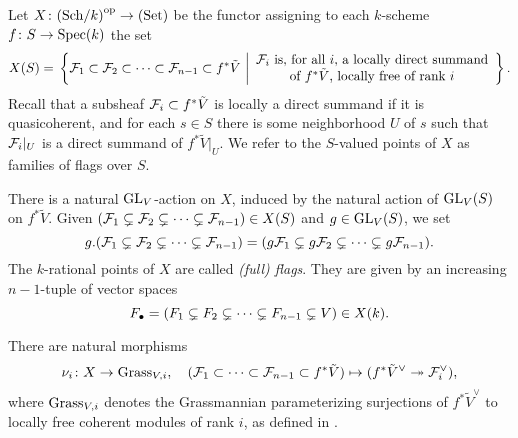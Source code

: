 \documentclass[../main.tex]{subfiles}
\begin{document}
\begin{defi}\label{def:FlagVariety}
  Let $X\colon  {(\mathrm{Sch}/{k})}^{\mathrm{op}} \to {(\mathrm{Set})}$ be the functor assigning to each $k$-scheme 
  $f\colon S \to \operatorname{Spec}(k)$
  the set 
  \begin{equation*}
    X(S) = \\ \left\{\cF_1 \subset \cF_2 \subset \dots \subset \cF_{n-1} \subset
      f^* \tilde V \ \bigg \vert  \begin{array}c
      \text{$\cF_i$ is, for all $i$, a locally direct summand} \\
      \text{of $f^*\tilde V$, locally free of rank $i$}
  \end{array} \right\}.
  \end{equation*}
  Recall that a subsheaf $\mathcal{F}_i \subset f^* \tilde V$ is
  locally a direct summand if it is quasicoherent, and for each $s \in S$ there is some neighborhood $U$ of $s$ such that $\mathcal{F}_i|_U$ is a direct summand of $f^* \tilde V|_U$. 
  We refer to the $S$-valued points of $X$ as families of flags over $S$.
\end{defi}
There is a natural $\operatorname{GL}_V$-action on $X$, induced by the natural action of 
$\operatorname{GL}_V(S)$ on $f^* \tilde V$. Given $(\mathcal{F}_1 \subsetneq \mathcal{F}_2 \subsetneq \dots 
    \subsetneq \mathcal{F}_{n-1}) \in X(S)$ and
$g \in \operatorname{GL}_V(S)$, we set 
\begin{equation*}
    g.(\mathcal{F}_1 \subsetneq \mathcal{F}_2 \subsetneq \dots 
    \subsetneq \mathcal{F}_{n-1}) = (g\mathcal{F}_1 \subsetneq g\mathcal{F}_2 \subsetneq \dots 
    \subsetneq g\mathcal{F}_{n-1}).
\end{equation*}
The $k$-rational points of $X$ are called \emph{(full) flags}. They are given by an increasing
$n-1$-tuple of vector spaces
$$F_\bullet = (F_1 \subsetneq F_2 \subsetneq \dots \subsetneq F_{n-1} \subsetneq V) \in X(k).$$

  There are natural morphisms
  \begin{equation*}
    \nu_i\colon X \to \operatorname{Grass}_{V,i}, \quad (\mathcal{F}_1 \subset \dots \subset \mathcal{F}_{n-1}
    \subset f^* \tilde V) \mapsto (f^* \tilde V^\vee \twoheadrightarrow \mathcal{F}_i^\vee),
  \end{equation*}
  where $\operatorname{Grass}_{V,i}$ denotes the Grassmannian parameterizing surjections of
  $f^*\tilde V^\vee$ to locally free coherent modules of rank $i$, as defined
  in \cite[ 8]{gortz2020algebraic}.
\end{document}
